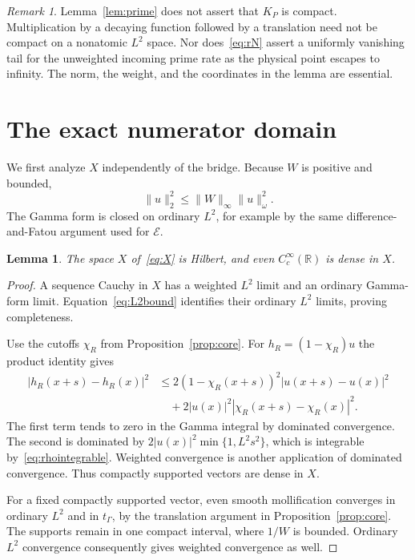 \documentclass[11pt,a4paper]{article}
\numberwithin{equation}{section}
\newtheorem{lemma}[theorem]{Lemma}
\theoremstyle{definition}
\theoremstyle{remark}
\newtheorem{remark}[theorem]{Remark}
\newcommand{\R}{\mathbb R}
\newcommand{\E}{\mathcal E}
\newcommand{\tg}{t_{\Gamma}}
\newcommand{\norm}[1]{\lVert #1\rVert}
\begin{document}
\begin{remark}
Lemma~\ref{lem:prime} does not assert that $K_P$ is compact. Multiplication by a decaying function followed by a translation need not be compact on a nonatomic $L^2$ space. Nor does~\eqref{eq:rN} assert a uniformly vanishing tail for the unweighted incoming prime rate as the physical point escapes to infinity. The norm, the weight, and the coordinates in the lemma are essential.
\end{remark}

\section{The exact numerator domain}\label{sec:domain}

We first analyze $X$ independently of the bridge. Because $W$ is positive and bounded,
\begin{equation}\label{eq:L2bound}
 \norm{u}_2^2\le\norm{W}_\infty\norm{u}_\omega^2.
\end{equation}
The Gamma form is closed on ordinary $L^2$, for example by the same difference-and-Fatou argument used for $\E$.

\begin{lemma}\label{lem:Xcore}
The space $X$ of~\eqref{eq:X} is Hilbert, and even $C_c^\infty(\R)$ is dense in $X$.
\end{lemma}
\begin{proof}
A sequence Cauchy in $X$ has a weighted $L^2$ limit and an ordinary Gamma-form limit. Equation~\eqref{eq:L2bound} identifies their ordinary $L^2$ limits, proving completeness.

Use the cutoffs $\chi_R$ from Proposition~\ref{prop:core}. For $h_R=(1-\chi_R)u$ the product identity gives
\begin{align*}
 |h_R(x+s)-h_R(x)|^2
 &\le2(1-\chi_R(x+s))^2|u(x+s)-u(x)|^2\\
 &\quad+2|u(x)|^2|\chi_R(x+s)-\chi_R(x)|^2.
\end{align*}
The first term tends to zero in the Gamma integral by dominated convergence. The second is dominated by
$2|u(x)|^2\min\{1,L^2s^2\}$, which is integrable by~\eqref{eq:rhointegrable}. Weighted convergence is another application of dominated convergence. Thus compactly supported vectors are dense in $X$.

For a fixed compactly supported vector, even smooth mollification converges in ordinary $L^2$ and in $\tg$, by the translation argument in Proposition~\ref{prop:core}. The supports remain in one compact interval, where $1/W$ is bounded. Ordinary $L^2$ convergence consequently gives weighted convergence as well.
\end{proof}
\end{document}
